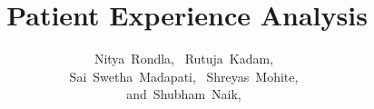 %
%






\documentclass[11pt,journal]{IEEEtran}


\usepackage{xcolor,soul,framed} %

\usepackage[pdftex]{graphicx}
\graphicspath{{../pdf/}{../jpeg/}}

\usepackage[cmex12]{amsmath}
\usepackage{array}
\usepackage{mdwmath}
\usepackage{mdwtab}
\usepackage{eqparbox}
\usepackage{url}





\title{Patient Experience Analysis}
\author{
    Nitya~Rondla,~
    Rutuja~Kadam,~\\
    Sai~Swetha~Madapati,~
    Shreyas~Mohite,~ \\
    and~Shubham~Naik,~%
    
}

{Rondla \MakeLowercase{\textit{et al.}}: Patient Experience Analysis}

\maketitle



